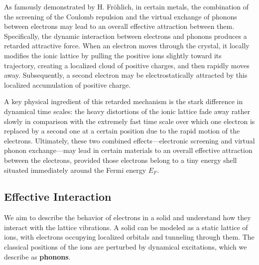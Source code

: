 As famously demonstrated by H. Fröhlich, in certain metals, the combination of the screening of the Coulomb repulsion and the virtual exchange of phonons between electrons may lead to an overall effective attraction between them. Specifically, the dynamic interaction between electrons and phonons produces a retarded attractive force. When an electron moves through the crystal, it locally modifies the ionic lattice by pulling the positive ions slightly toward its trajectory, creating a localized cloud of positive charges, and then rapidly moves away. Subsequently, a second electron may be electrostatically attracted by this localized accumulation of positive charge.

A key physical ingredient of this retarded mechanism is the stark difference in dynamical time scales: the heavy distortions of the ionic lattice fade away rather slowly in comparison with the extremely fast time scale over which one electron is replaced by a second one at a certain position due to the rapid motion of the electrons. Ultimately, these two combined effects—electronic screening and virtual phonon exchange—may lead in certain materials to an overall effective attraction between the electrons, provided those electrons belong to a tiny energy shell situated immediately around the Fermi energy \( E_F \).


\subsection{Effective Interaction}

We aim to describe the behavior of electrons in a solid and understand how they interact with the lattice vibrations. A solid can be modeled as a static lattice of ions, with electrons occupying localized orbitals and tunneling through them. The classical positions of the ions are perturbed by dynamical excitations, which we describe as \textbf{phonons}.

